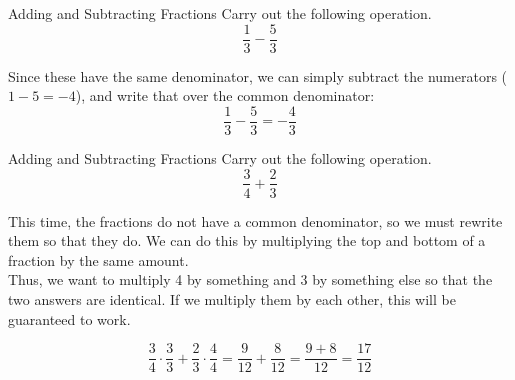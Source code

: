 \begin{example}{Adding and Subtracting Fractions}
Carry out the following operation.
\[\dfrac{1}{3} - \dfrac{5}{3}\]

\sol
Since these have the same denominator, we can simply subtract the numerators ($1-5 = -4$), and write that over the common denominator:
\[\dfrac{1}{3} - \dfrac{5}{3} = \boxed{-\dfrac{4}{3}}\]
\end{example}

\begin{example}{Adding and Subtracting Fractions}
Carry out the following operation.
\[\dfrac{3}{4} + \dfrac{2}{3}\]

\sol
This time, the fractions do not have a common denominator, so we must rewrite them so that they do.  We can do this by multiplying the top and bottom of a fraction by the same amount.\\

Thus, we want to multiply 4 by something and 3 by something else so that the two answers are identical.  If we multiply them by each other, this will be guaranteed to work.

\[\dfrac{3}{4} \cdot \dfrac{3}{3} + \dfrac{2}{3} \cdot \dfrac{4}{4} = \dfrac{9}{12} + \dfrac{8}{12} = \dfrac{9+8}{12} = \boxed{\dfrac{17}{12}}\]
\end{example}

